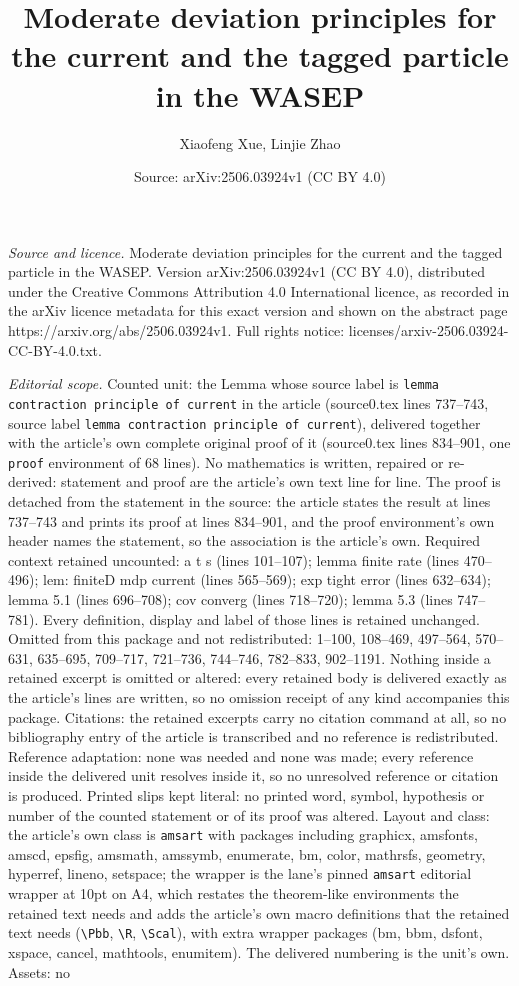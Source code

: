 \documentclass[10pt,a4paper]{amsart}
\title[Moderate deviation principles for the current and the tagged]{Moderate deviation principles for the current and the tagged particle in the WASEP}
\author{Xiaofeng Xue, Linjie Zhao}
\date{Source: arXiv:2506.03924v1 (CC BY 4.0)}
\begin{document}
\maketitle

\noindent\emph{Source and licence.} Moderate deviation principles for the current and the tagged particle in the WASEP. Version arXiv:2506.03924v1 (CC BY 4.0), distributed under the Creative Commons Attribution 4.0 International licence, as recorded in the arXiv licence metadata for this exact version and shown on the abstract page https://arxiv.org/abs/2506.03924v1. Full rights notice: licenses/arxiv-2506.03924-CC-BY-4.0.txt.\par\smallskip

\noindent\textit{Editorial scope.} Counted unit: the Lemma whose source label is \texttt{lemma contraction principle of current} in the article (source0.tex lines 737--743, source label \texttt{lemma contraction principle of current}), delivered together with the article's own complete original proof of it (source0.tex lines 834--901, one \texttt{proof} environment of 68 lines). No mathematics is written, repaired or re-derived: statement and proof are the article's own text line for line. The proof is detached from the statement in the source: the article states the result at lines 737--743 and prints its proof at lines 834--901, and the proof environment's own header names the statement, so the association is the article's own. Required context retained uncounted: a t s (lines 101--107); lemma finite rate (lines 470--496); lem: finiteD mdp current (lines 565--569); exp tight error (lines 632--634); lemma 5.1 (lines 696--708); cov converg (lines 718--720); lemma 5.3 (lines 747--781). Every definition, display and label of those lines is retained unchanged. Omitted from this package and not redistributed: 1--100, 108--469, 497--564, 570--631, 635--695, 709--717, 721--736, 744--746, 782--833, 902--1191. Nothing inside a retained excerpt is omitted or altered: every retained body is delivered exactly as the article's lines are written, so no omission receipt of any kind accompanies this package. Citations: the retained excerpts carry no citation command at all, so no bibliography entry of the article is transcribed and no reference is redistributed. Reference adaptation: none was needed and none was made; every reference inside the delivered unit resolves inside it, so no unresolved reference or citation is produced. Printed slips kept literal: no printed word, symbol, hypothesis or number of the counted statement or of its proof was altered. Layout and class: the article's own class is \texttt{amsart} with packages including graphicx, amsfonts, amscd, epsfig, amsmath, amssymb, enumerate, bm, color, mathrsfs, geometry, hyperref, lineno, setspace; the wrapper is the lane's pinned \texttt{amsart} editorial wrapper at 10pt on A4, which restates the theorem-like environments the retained text needs and adds the article's own macro definitions that the retained text needs (\texttt{\textbackslash Pbb}, \texttt{\textbackslash R}, \texttt{\textbackslash Scal}), with extra wrapper packages (bm, bbm, dsfont, xspace, cancel, mathtools, enumitem). The delivered numbering is the unit's own. Assets: no 
\end{document}
